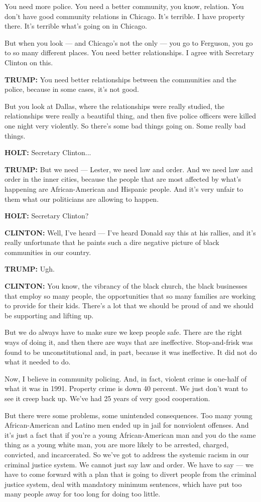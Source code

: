 You need more police. You need a better community, you know, relation.
You don't have good community relations in Chicago. It's terrible. I
have property there. It's terrible what's going on in Chicago.

But when you look --- and Chicago's not the only --- you go to Ferguson,
you go to so many different places. You need better relationships. I
agree with Secretary Clinton on this.

\textbf{TRUMP:} You need better relationships between the communities
and the police, because in some cases, it's not good.

But you look at Dallas, where the relationships were really studied, the
relationships were really a beautiful thing, and then five police
officers were killed one night very violently. So there's some bad
things going on. Some really bad things.

\textbf{HOLT:} Secretary Clinton...

\textbf{TRUMP:} But we need --- Lester, we need law and order. And we
need law and order in the inner cities, because the people that are most
affected by what's happening are African-American and Hispanic people.
And it's very unfair to them what our politicians are allowing to
happen.

\textbf{HOLT:} Secretary Clinton?

\textbf{CLINTON:} Well, I've heard --- I've heard Donald say this at his
rallies, and it's really unfortunate that he paints such a dire negative
picture of black communities in our country.

\textbf{TRUMP:} Ugh.

\textbf{CLINTON:} You know, the vibrancy of the black church, the black
businesses that employ so many people, the opportunities that so many
families are working to provide for their kids. There's a lot that we
should be proud of and we should be supporting and lifting up.

But we do always have to make sure we keep people safe. There are the
right ways of doing it, and then there are ways that are ineffective.
Stop-and-frisk was found to be unconstitutional and, in part, because it
was ineffective. It did not do what it needed to do.

Now, I believe in community policing. And, in fact, violent crime is
one-half of what it was in 1991. Property crime is down 40 percent. We
just don't want to see it creep back up. We've had 25 years of very good
cooperation.

But there were some problems, some unintended consequences. Too many
young African-American and Latino men ended up in jail for nonviolent
offenses. And it's just a fact that if you're a young African-American
man and you do the same thing as a young white man, you are more likely
to be arrested, charged, convicted, and incarcerated. So we've got to
address the systemic racism in our criminal justice system. We cannot
just say law and order. We have to say --- we have to come forward with
a plan that is going to divert people from the criminal justice system,
deal with mandatory minimum sentences, which have put too many people
away for too long for doing too little.


